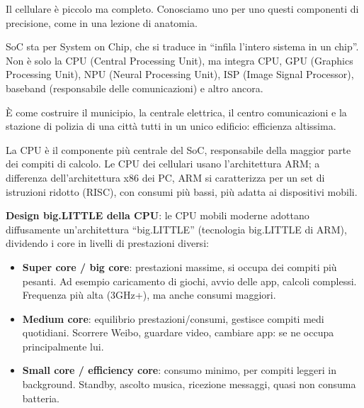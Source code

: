 


Il cellulare è piccolo ma completo. Conosciamo uno per uno questi componenti di precisione, come in una lezione di anatomia.


SoC sta per System on Chip, che si traduce in “infila l'intero sistema in un chip”. Non è solo la CPU (Central Processing Unit), ma integra CPU, GPU (Graphics Processing Unit), NPU (Neural Processing Unit), ISP (Image Signal Processor), baseband (responsabile delle comunicazioni) e altro ancora.

È come costruire il municipio, la centrale elettrica, il centro comunicazioni e la stazione di polizia di una città tutti in un unico edificio: efficienza altissima.


La CPU è il componente più centrale del SoC, responsabile della maggior parte dei compiti di calcolo. Le CPU dei cellulari usano l'architettura ARM; a differenza dell'architettura x86 dei PC, ARM si caratterizza per un set di istruzioni ridotto (RISC), con consumi più bassi, più adatta ai dispositivi mobili.

\textbf{Design big.LITTLE della CPU}: le CPU mobili moderne adottano diffusamente un'architettura “big.LITTLE” (tecnologia big.LITTLE di ARM), dividendo i core in livelli di prestazioni diversi:

\begin{itemize}
  \item \textbf{Super core / big core}: prestazioni massime, si occupa dei compiti più pesanti. Ad esempio caricamento di giochi, avvio delle app, calcoli complessi. Frequenza più alta (3GHz+), ma anche consumi maggiori.
  \item \textbf{Medium core}: equilibrio prestazioni/consumi, gestisce compiti medi quotidiani. Scorrere Weibo, guardare video, cambiare app: se ne occupa principalmente lui.
  \item \textbf{Small core / efficiency core}: consumo minimo, per compiti leggeri in background. Standby, ascolto musica, ricezione messaggi, quasi non consuma batteria.
\end{itemize}

